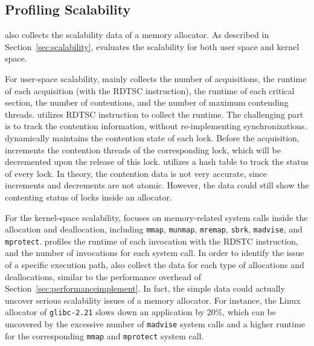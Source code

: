   
 

\subsection{Profiling Scalability}
\label{sec:profilingscale}

\MP{} also collects the scalability data of a memory allocator. As described in Section~\ref{sec:scalability}, \MP{} evaluates the scalability for both user space and kernel space. 

For user-space scalability, \MP{} mainly collects the number of acquisitions, the runtime of each acquisition (with the RDTSC instruction), the runtime of each critical section, the number of contentions, and the number of maximum contending threads. \MP{} utilizes RDTSC instruction to collect the runtime. The challenging part is to track the contention information, without re-implementing synchronizations. \MP{} dynamically maintains the contention state of each lock. Before the acquisition, \MP{} increments the contention threads of the corresponding lock, which will be decremented upon the release of this lock. \MP{} utilizes a hash table to track the status of every lock. In theory, the contention data is not very accurate, since increments and decrements are not atomic. However, the data could still show the contenting status of locks inside an allocator.    

For the kernel-space scalability, \MP{} focuses on memory-related system calls inside the allocation and deallocation, including \texttt{mmap}, \texttt{munmap}, \texttt{mremap}, \texttt{sbrk}, \texttt{madvise}, and \texttt{mprotect}. \MP{} profiles the runtime of each invocation with the RDSTC instruction, and the number of invocations for each system call. In order to identify the issue of a specific execution path, \MP{} also collect the data for each type of allocations and deallocations, similar to the performance overhead of Section~\ref{sec:performanceimplement}.
In fact, the simple data could actually uncover serious scalability issues of a memory allocator. For instance, the Linux allocator of \texttt{glibc-2.21} slows down an application by 20\%, which can be uncovered by the excessive number of \texttt{madvise} system calls and a higher runtime for the corresponding \texttt{mmap} and \texttt{mprotect} system call. 


